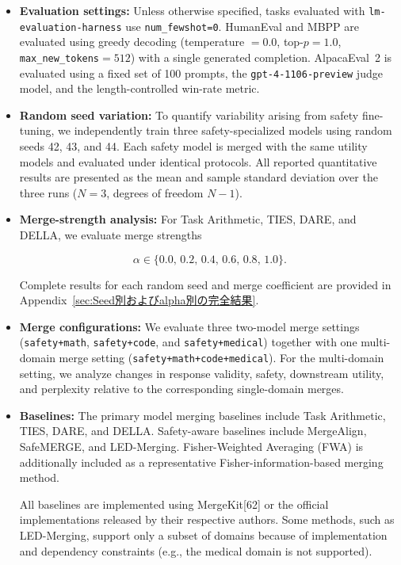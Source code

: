 \documentclass{article}
\begin{document}
\begin{itemize}
\begin{itemize}
\item \textbf{Evaluation settings:}
Unless otherwise specified, tasks evaluated with \texttt{lm-evaluation-harness} use \texttt{num\_fewshot=0}. HumanEval and MBPP are evaluated using greedy decoding (temperature $=0.0$, top-$p=1.0$, \texttt{max\_new\_tokens}$=512$) with a single generated completion. AlpacaEval~2 is evaluated using a fixed set of 100 prompts, the \texttt{gpt-4-1106-preview} judge model, and the length-controlled win-rate metric.

\item \textbf{Random seed variation:}
To quantify variability arising from safety fine-tuning, we independently train three safety-specialized models using random seeds 42, 43, and 44. Each safety model is merged with the same utility models and evaluated under identical protocols. All reported quantitative results are presented as the mean and sample standard deviation over the three runs ($N=3$, degrees of freedom $N-1$).

\item \textbf{Merge-strength analysis:}
For Task Arithmetic, TIES, DARE, and DELLA, we evaluate merge strengths

\[
\alpha \in \{0.0,\,0.2,\,0.4,\,0.6,\,0.8,\,1.0\}.
\]

Complete results for each random seed and merge coefficient are provided in Appendix~\ref{sec:Seed別およびalpha別の完全結果}.

\item \textbf{Merge configurations:}
We evaluate three two-model merge settings (\texttt{safety+math}, \texttt{safety+code}, and \texttt{safety+medical}) together with one multi-domain merge setting (\texttt{safety+math+code+medical}). For the multi-domain setting, we analyze changes in response validity, safety, downstream utility, and perplexity relative to the corresponding single-domain merges.

\item \textbf{Baselines:}
The primary model merging baselines include Task Arithmetic, TIES, DARE, and DELLA. Safety-aware baselines include MergeAlign, SafeMERGE, and LED-Merging. Fisher-Weighted Averaging (FWA) is additionally included as a representative Fisher-information-based merging method.

All baselines are implemented using MergeKit[62] or the official implementations released by their respective authors. Some methods, such as LED-Merging, support only a subset of domains because of implementation and dependency constraints (e.g., the medical domain is not supported).


\end{itemize}
\end{itemize}
\end{document}
